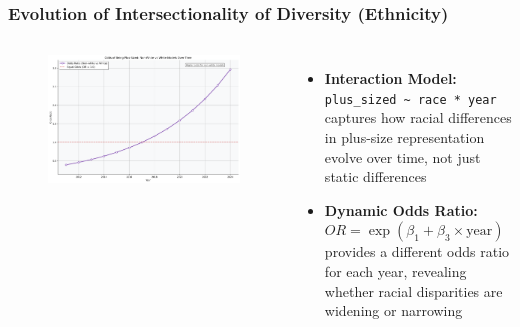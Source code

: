 \documentclass[aspectratio=169,xcolor=dvipsnames,10pt]{beamer}
\begin{document}
\begin{frame}[t]
    \frametitle{Evolution of Intersectionality of Diversity (Ethnicity)}
     \begin{columns}

    \begin{figure}
            \begin{center}
            \includegraphics[width=\textwidth]{figures/race_odds_ratio_trends_odds_ratio.png}
            \end{center}
        \end{figure}

        \begin{itemize}
    \setlength{\itemsep}{1em}
    \pause \item \textbf{Interaction Model:} \texttt{plus\_sized \textasciitilde{} race * year} captures how racial differences in plus-size representation evolve over time, not just static differences
    \pause \item \textbf{Dynamic Odds Ratio:} $OR = \exp(\beta_{1} + \beta_{3} \times \text{year})$ provides a different odds ratio for each year, revealing whether racial disparities are widening or narrowing
\end{itemize}
    \end{columns}

\end{frame}
\end{document}
